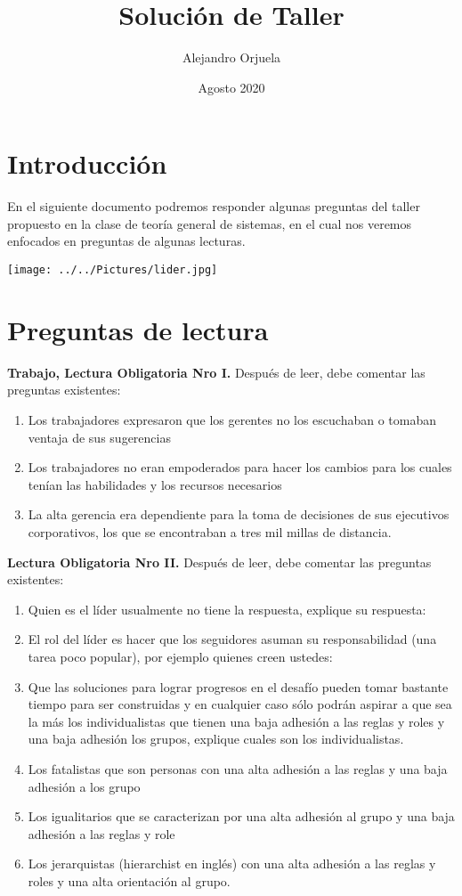 \documentclass{article}
\title{Solución de Taller}
\author{Alejandro Orjuela }
\date{Agosto 2020}
\begin{document}
\maketitle

\begin{multicols}{2}
\section{Introducción}
 En el siguiente documento podremos responder algunas preguntas del taller propuesto  en la clase de teoría general de sistemas, en el cual nos veremos enfocados en preguntas de algunas lecturas.


\texttt{[image: ../../Pictures/lider.jpg]} 


\section{Preguntas de lectura}

\textbf{Trabajo, Lectura Obligatoria Nro I.}
Después de leer, debe comentar las preguntas existentes:

\begin{enumerate}
\item Los trabajadores expresaron que los gerentes no los escuchaban o tomaban ventaja de sus sugerencias
\item  Los trabajadores no eran empoderados para hacer los cambios para los cuales tenían las habilidades y los recursos necesarios
\item  La alta gerencia era dependiente para la toma de decisiones de sus ejecutivos corporativos, los que se encontraban a tres mil millas de distancia.
\end{enumerate}


\textbf{Lectura Obligatoria Nro II.}
 Después de leer, debe comentar las preguntas existentes:
 

  \begin{enumerate}
\item  Quien es el líder usualmente no tiene la respuesta, explique su respuesta:
\item    El rol del líder es hacer que los seguidores asuman su responsabilidad (una tarea poco popular), por ejemplo quienes creen ustedes:
\item   Que las soluciones para lograr progresos en el desafío pueden tomar bastante tiempo para ser construidas y en cualquier caso sólo podrán aspirar a que sea la más los individualistas que tienen una baja adhesión a las reglas y roles y una baja adhesión los grupos, explique cuales son los individualistas.
\item   Los fatalistas que son personas con una alta adhesión a las reglas y una baja adhesión a los grupo
\item   Los igualitarios que se caracterizan por una alta adhesión al grupo y una baja adhesión a las reglas y role
\item   Los jerarquistas (hierarchist en inglés) con una alta adhesión a las reglas y roles y una alta orientación al grupo.
\end{enumerate}


\end{multicols}
\end{document}
